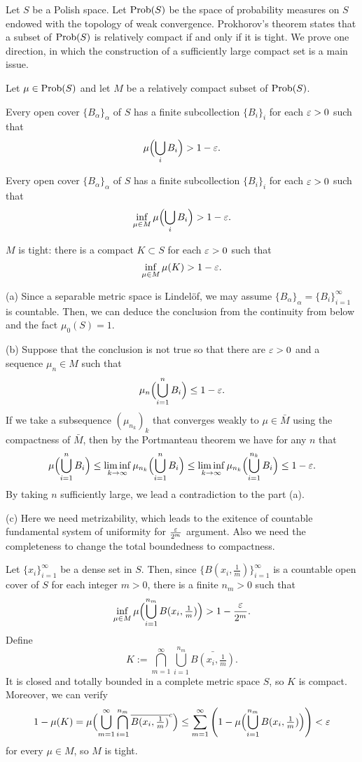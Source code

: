 \documentclass{../../large}
\begin{document}
\begin{prb}
Let $S$ be a Polish space.
Let $\operatorname{Prob}(S)$ be the space of probability measures on $S$ endowed with the topology of weak convergence.
Prokhorov's theorem states that a subset of $\operatorname{Prob}(S)$ is relatively compact if and only if it is tight.
We prove one direction, in which the construction of a sufficiently large compact set is a main issue.

Let $\mu\in\operatorname{Prob}(S)$ and let $M$ be a relatively compact subset of $\operatorname{Prob}(S)$.
\begin{parts}
\item Every open cover $\{B_\alpha\}_\alpha$ of $S$ has a finite subcollection $\{B_i\}_i$ for each $\varepsilon>0$ such that
\[\mu\Bigl(\bigcup_iB_i\Bigr)>1-\varepsilon.\]
\item Every open cover $\{B_\alpha\}_\alpha$ of $S$ has a finite subcollection $\{B_i\}_i$ for each $\varepsilon>0$ such that
\[\inf_{\mu\in M}\mu\Bigl(\bigcup_iB_i\Bigr)>1-\varepsilon.\]
\item $M$ is tight: there is a compact $K\subset S$ for each $\varepsilon>0$ such that
\[\inf_{\mu\in M}\mu(K)>1-\varepsilon.\]
\end{parts}
\end{prb}
\begin{pf}
(a)
Since a separable metric space is Lindel\"of, we may assume $\{B_\alpha\}_\alpha=\{B_i\}_{i=1}^\infty$ is countable.
Then, we can deduce the conclusion from the continuity from below and the fact $\mu_0(S)=1$.

(b)
Suppose that the conclusion is not true so that there are $\varepsilon>0$ and a sequence $\mu_n\in M$ such that
\[\mu_n\Bigl(\bigcup_{i=1}^nB_i\Bigr)\le1-\varepsilon.\]
If we take a subsequence $(\mu_{n_k})_k$ that converges weakly to $\mu\in\bar M$ using the compactness of $\bar M$, then by the Portmanteau theorem we have for any $n$ that
\[\mu\Bigl(\bigcup_{i=1}^nB_i\Bigr)\le\liminf_{k\to\infty}\mu_{n_k}\Bigl(\bigcup_{i=1}^nB_i\Bigr)\le\liminf_{k\to\infty}\mu_{n_k}\Bigl(\bigcup_{i=1}^{n_k}B_i\Bigr)\le1-\varepsilon.\]
By taking $n$ sufficiently large, we lead a contradiction to the part (a).

(c)
Here we need metrizability, which leads to the exitence of countable fundamental system of uniformity for $\frac{\varepsilon}{2^m}$ argument.
Also we need the completeness to change the total boundedness to compactness.

Let $\{x_i\}_{i=1}^\infty$ be a dense set in $S$.
Then, since $\{B(x_i,\frac1m)\}_{i=1}^\infty$ is a countable open cover of $S$ for each integer $m>0$, there is a finite $n_m>0$ such that
\[\inf_{\mu\in M}\mu\Bigl(\bigcup_{i=1}^{n_m}B(x_i,\tfrac1m)\Bigr)>1-\frac{\varepsilon}{2^m}.\]
Define
\[K:=\bigcap_{m=1}^\infty\bigcup_{i=1}^{n_m}\bar{B(x_i,\tfrac1m)}.\]
It is closed and totally bounded in a complete metric space $S$, so $K$ is compact.
Moreover, we can verify
\[1-\mu(K)=\mu\Bigl(\bigcup_{m=1}^\infty\bigcap_{i=1}^{n_m}\overline{B(x_i,\tfrac1m)}^c\Bigr)\le\sum_{m=1}^\infty\left(1-\mu\Bigl(\bigcup_{i=1}^{n_m}B(x_i,\tfrac1m)\Bigr)\right)<\varepsilon\]
for every $\mu\in M$, so $M$ is tight.
\end{pf}
\end{document}

